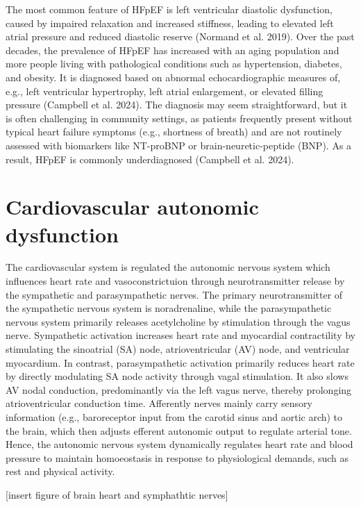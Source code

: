 \documentclass[
  a4paper,
  headsepline=true,
  open=any]{scrbook}
\begin{document}
The most common feature of HFpEF is left ventricular diastolic
dysfunction, caused by impaired relaxation and increased stiffness,
leading to elevated left atrial pressure and reduced diastolic reserve
(Normand et al. 2019). Over the past decades, the prevalence of HFpEF
has increased with an aging population and more people living with
pathological conditions such as hypertension, diabetes, and obesity. It
is diagnosed based on abnormal echocardiographic measures of, e.g., left
ventricular hypertrophy, left atrial enlargement, or elevated filling
pressure (Campbell et al. 2024). The diagnosis may seem straightforward,
but it is often challenging in community settings, as patients
frequently present without typical heart failure symptoms (e.g.,
shortness of breath) and are not routinely assessed with biomarkers like
NT-proBNP or brain-neuretic-peptide (BNP). As a result, HFpEF is
commonly underdiagnosed (Campbell et al. 2024).

\hypertarget{cardiovascular-autonomic-dysfunction}{%
\section{Cardiovascular autonomic
dysfunction}\label{cardiovascular-autonomic-dysfunction}}

The cardiovascular system is regulated the autonomic nervous system
which influences heart rate and vasoconstrictuion through
neurotransmitter release by the sympathetic and parasympathetic nerves.
The primary neurotransmitter of the sympathetic nervous system is
noradrenaline, while the parasympathetic nervous system primarily
releases acetylcholine by stimulation through the vagus nerve.
Sympathetic activation increases heart rate and myocardial contractility
by stimulating the sinoatrial (SA) node, atrioventricular (AV) node, and
ventricular myocardium. In contrast, parasympathetic activation
primarily reduces heart rate by directly modulating SA node activity
through vagal stimulation. It also slows AV nodal conduction,
predominantly via the left vagus nerve, thereby prolonging
atrioventricular conduction time. Afferently nerves mainly carry sensory
information (e.g., baroreceptor input from the carotid sinus and aortic
arch) to the brain, which then adjusts efferent autonomic output to
regulate arterial tone. Hence, the autonomic nervous system dynamically
regulates heart rate and blood pressure to maintain homoeostasis in
response to physiological demands, such as rest and physical activity.

{[}insert figure of brain heart and symphathtic nerves{]}
\end{document}
